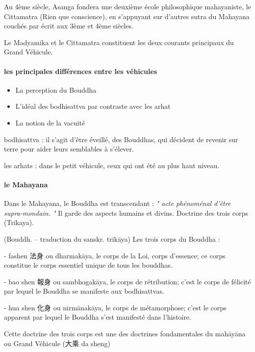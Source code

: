  Au 4ème siècle, Asanga fondera une deuxième école philosophique mahayaniste, le Cittamatra (Rien que conscience), en s’appuyant sur d’autres sutra du Mahayana couchés par écrit aux 3ème et 4ème siècles.
 
 Le Madyamika et le Cittamatra constituent les deux courants principaux du Grand Véhicule.

\paragraph{les principales différences entre les véhicules}

\begin{itemize}
    \item  La perception du Bouddha
   \item L’idéal des bodhisattva par contraste avec les arhat
   \item 	La notion de la vacuité
\end{itemize}


bodhisattva : il s'agit d'être éveillé, des Bouddhas, qui décident de revenir sur terre pour aider leurs semblables à s'élever.

les arhats : dans le petit véhicule, ceux qui ont été au plus haut niveau. 

\paragraph{le Mahayana}

Dans le Mahayana, le Bouddha est transcendant : \textit{" acte phénoménal d'être supra-mondain. "} Il garde des aspects humains et divins. Doctrine des trois corps (Trikaya). 

\begin{Def}[sanshen 三身]
    (Bouddh. – traduction du sanskr. trikāya)	Les trois corps du Bouddha :	
    
    - fashen 法身 ou dharmakāya, le corps de la Loi, corps d’essence; ce corps constitue le corps essentiel unique de tous les bouddhas. 
    
    - bao shen 報身 ou sambhogakāya, le corps de rétribution; c’est le corps de félicité par lequel le Bouddha se manifeste aux bodhisattvas. 
    
    - hua shen 化身 ou nirmānakāya, le corps de métamorphose; c’est le corps apparent par lequel le Bouddha s’est manifesté dans l’histoire. 
    
    Cette doctrine des trois corps est une des doctrines fondamentales du mahāyāna ou Grand Véhicule (大乘 da sheng) 
\end{Def}




